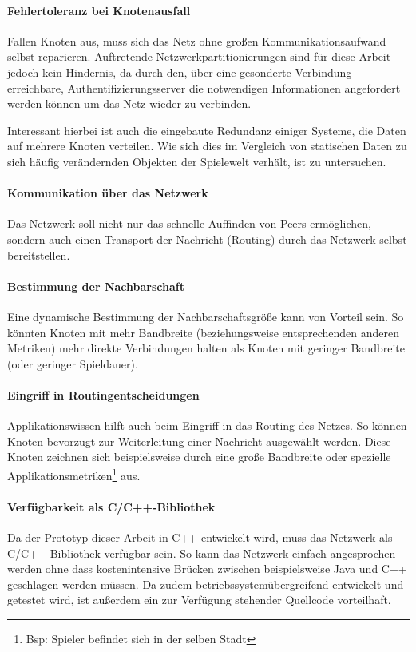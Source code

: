 \paragraph{Fehlertoleranz bei Knotenausfall} Fallen Knoten aus, muss sich das Netz ohne großen Kommunikationsaufwand selbst reparieren. Auftretende Netzwerkpartitionierungen sind für diese Arbeit jedoch kein Hindernis, da durch den, über eine gesonderte Verbindung erreichbare, Authentifizierungsserver die notwendigen Informationen angefordert werden können um das Netz wieder zu verbinden.

Interessant hierbei ist auch die eingebaute Redundanz einiger Systeme, die Daten auf mehrere Knoten verteilen. Wie sich dies im Vergleich von statischen Daten zu sich häufig verändernden Objekten der Spielewelt verhält, ist zu untersuchen. 

\paragraph{Kommunikation über das Netzwerk} Das Netzwerk soll nicht nur das schnelle Auffinden von Peers ermöglichen, sondern auch einen Transport der Nachricht (Routing) durch das Netzwerk selbst bereitstellen.

\paragraph{Bestimmung der Nachbarschaft} Eine dynamische Bestimmung der Nachbarschaftsgröße kann von Vorteil sein. So könnten Knoten mit mehr Bandbreite (beziehungsweise entsprechenden anderen Metriken) mehr direkte Verbindungen halten als Knoten mit geringer Bandbreite (oder geringer Spieldauer).

\paragraph{Eingriff in Routingentscheidungen} Applikationswissen hilft auch beim Eingriff in das Routing des Netzes. So können Knoten bevorzugt zur Weiterleitung einer Nachricht ausgewählt werden. Diese Knoten zeichnen sich beispielsweise durch eine große Bandbreite oder spezielle Applikationsmetriken\footnote{Bsp: Spieler befindet sich in der selben Stadt} aus.

\paragraph{Verfügbarkeit als C/C++-Bibliothek} Da der Prototyp dieser Arbeit in C++ entwickelt wird, muss das Netzwerk als C/C++-Bibliothek verfügbar sein. So kann das Netzwerk einfach angesprochen werden ohne dass kostenintensive Brücken zwischen beispielsweise Java und C++ geschlagen werden müssen. Da zudem betriebssystemübergreifend entwickelt und getestet wird, ist außerdem ein zur Verfügung stehender Quellcode vorteilhaft.

